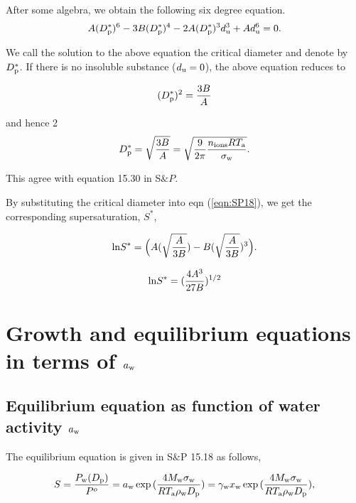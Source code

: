 \documentclass[12pt]{article}
\begin{document}
After some algebra, we obtain the following six degree equation.
\begin{equation}\label{eqn:SP21}
A(D_{\rm p}^{*})^{6}-3B(D_{\rm p}^{*})^{4}-2 A(D_{\rm p}^{*})^{3} d_{\rm u}^{3}+ A d_{\rm u}^{6}=0.
\end{equation}

We call the solution to the above equation the critical diameter and denote by $D_{\rm p}^{*}$. If there is no insoluble substance ($d_{\rm u}=0$), the above equation reduces to 

\begin{equation}\label{eqn:SP22}
(D_{\rm p}^{*})^{2}=\frac{3B}{A} 
\end{equation}

and hence 
2
\begin{equation}\label{eqn:SP23}
D_{\rm p}^{*}=\sqrt{\frac{3B}{A}}= \sqrt {\frac{9}{2 \pi} \frac{n_{\rm ions} RT_{\rm a}}{\sigma_{\rm w}}}.
\end{equation}

This agree with equation 15.30 in S$\&P$.

By substituting the critical diameter into eqn (\ref{eqn:SP18}), we get the corresponding supersaturation, $S^{*}$,


\begin{equation}\label{eqn:SP24}
{\rm ln} S^{*} = \Big(A (\sqrt{\frac{A}{3B}})   -   B (\sqrt{\frac{A}{3B}}) ^{3} \Big).
\end{equation}


\begin{equation}\label{eqn:SP25}
{\rm ln}  S^{*}=(\frac{4A^{3}}{27B})^{1/2}
\end{equation}

 
\section{Growth and equilibrium equations in terms of $a_{\rm w}$} 
\subsection{Equilibrium equation as function of water activity $a_{\rm w}$}

The equilibrium equation is given in S$\&$P 15.18 as follows, 

\begin{equation}\label{eqn:1}
S=\frac{P_{\rm w}(D_{\rm p})}{P^{o}}=a_{\rm w}\exp{(\frac{4 M_{\rm w} \sigma_{\rm w}}{R T_{\rm a} \rho_{\rm w} D_{\rm p}})}=\gamma_{\rm w}x_{\rm w}\exp{(\frac{4 M_{\rm w} \sigma_{\rm w}}{R T_{\rm a} \rho_{\rm w} D_{\rm p}})},
\end{equation}
\end{document}
